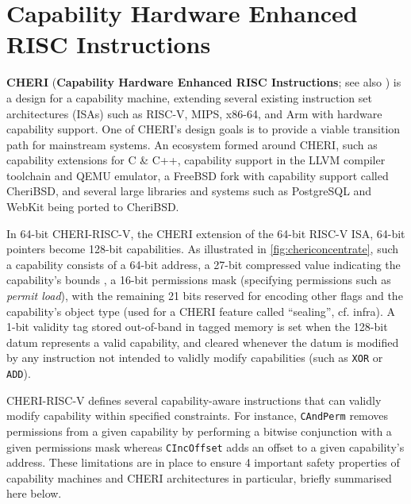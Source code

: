 \documentclass[main.tex]{subfiles}
\begin{document}
\section{Capability Hardware Enhanced RISC Instructions}
\textbf{CHERI} (\textbf{Capability Hardware Enhanced RISC Instructions}; see also \cite{intro2cheri}) is a design for a capability machine, extending several existing instruction set architectures (ISAs) such as RISC-V, MIPS, x86-64, and Arm with hardware capability support. One of CHERI’s design goals is to provide a viable transition path for mainstream systems. An ecosystem formed around CHERI, such as capability extensions for C \& C++, capability support in the LLVM compiler toolchain and QEMU emulator, a FreeBSD fork with capability support called CheriBSD, and several large libraries and systems such as PostgreSQL and WebKit being ported to CheriBSD.

In 64-bit CHERI-RISC-V, the CHERI extension of the 64-bit RISC-V ISA, 64-bit pointers become 128-bit capabilities. As illustrated in \cref{fig:chericoncentrate}, such a capability consists of a 64-bit address, a 27-bit compressed value indicating the capability’s bounds , a 16-bit permissions mask (specifying permissions such as \emph{permit load}), with the remaining 21 bits reserved for encoding other flags and the capability’s object type (used for a CHERI feature called \enquote{\gls*{sealing}}, cf. infra). A 1-bit validity tag stored out-of-band in tagged memory is set when the 128-bit datum represents a valid capability, and cleared whenever the datum is modified by any instruction not intended to validly modify capabilities (such as \texttt{XOR} or \texttt{ADD}).

CHERI-RISC-V defines several capability-aware instructions that can validly modify capability within specified constraints. For instance, \texttt{CAndPerm} removes permissions from a given capability by performing a bitwise conjunction with a given permissions mask whereas \texttt{CIncOffset} adds an offset to a given capability's address. These limitations are in place to ensure 4 important safety properties of capability machines and CHERI architectures in particular, briefly summarised here below.
\end{document}
